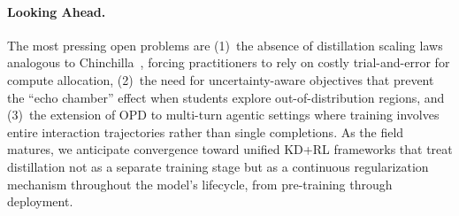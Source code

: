 \documentclass{article} %
\begin{document}
\paragraph{Looking Ahead.} The most pressing open problems are (1)~the absence of distillation scaling laws analogous to Chinchilla~\citep{2203.15556}, forcing practitioners to rely on costly trial-and-error for compute allocation, (2)~the need for uncertainty-aware objectives that prevent the ``echo chamber'' effect when students explore out-of-distribution regions, and (3)~the extension of OPD to multi-turn agentic settings where training involves entire interaction trajectories rather than single completions. As the field matures, we anticipate convergence toward unified KD+RL frameworks that treat distillation not as a separate training stage but as a continuous regularization mechanism throughout the model's lifecycle, from pre-training through deployment.




\end{document}
